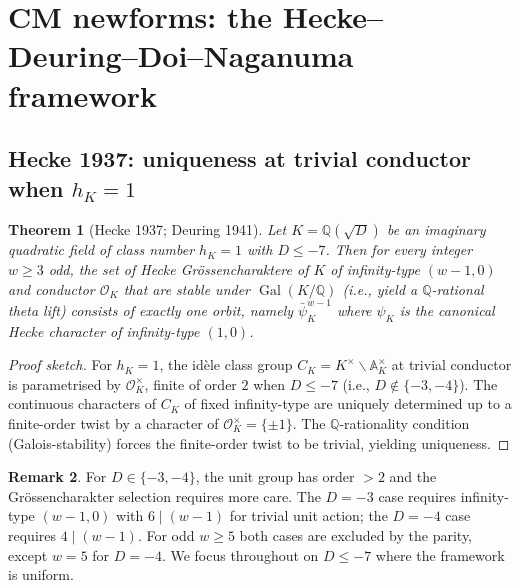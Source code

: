 \documentclass[11pt,a4paper]{amsart}
\newtheorem{theorem}{Theorem}[section]
\theoremstyle{definition}
\newtheorem{remark}[theorem]{Remark}
\DeclareMathOperator{\Gal}{Gal}
\newcommand{\Q}{\mathbb{Q}}
\newcommand{\OK}{\mathcal{O}_K}
\newcommand{\hK}{h_{K}}
\begin{document}
\section{CM newforms: the Hecke--Deuring--Doi--Naganuma framework}\label{sec:CMframework}

\subsection{Hecke 1937: uniqueness at trivial conductor when $h_K = 1$}\label{sec:hecke-uniqueness}

\begin{theorem}[Hecke 1937; Deuring 1941]\label{thm:hecke-unique}
Let $K = \Q(\sqrt{D})$ be an imaginary quadratic field of class number $\hK = 1$ with $D \le -7$. Then for every integer $w \ge 3$ odd, the set of Hecke Gr\"ossencharaktere of $K$ of infinity-type $(w-1, 0)$ and conductor $\OK$ that are stable under $\Gal(K/\Q)$ (i.e., yield a $\Q$-rational theta lift) consists of exactly one orbit, namely $\bar\psi_K^{w-1}$ where $\psi_K$ is the canonical Hecke character of infinity-type $(1, 0)$.
\end{theorem}

\begin{proof}[Proof sketch]
For $\hK = 1$, the id\`ele class group $C_K = K^\times \backslash \mathbb{A}_K^\times$ at trivial conductor is parametrised by $\OK^\times$, finite of order $2$ when $D \le -7$ (i.e., $D \notin \{-3, -4\}$). The continuous characters of $C_K$ of fixed infinity-type are uniquely determined up to a finite-order twist by a character of $\OK^\times = \{\pm 1\}$. The $\Q$-rationality condition (Galois-stability) forces the finite-order twist to be trivial, yielding uniqueness.
\end{proof}

\begin{remark}\label{rmk:D-3-D-4}
For $D \in \{-3, -4\}$, the unit group has order $> 2$ and the Gr\"ossencharakter selection requires more care. The $D = -3$ case requires infinity-type $(w-1, 0)$ with $6 \mid (w-1)$ for trivial unit action; the $D = -4$ case requires $4 \mid (w-1)$. For odd $w \ge 5$ both cases are excluded by the parity, except $w = 5$ for $D = -4$. We focus throughout on $D \le -7$ where the framework is uniform.
\end{remark}
\end{document}
